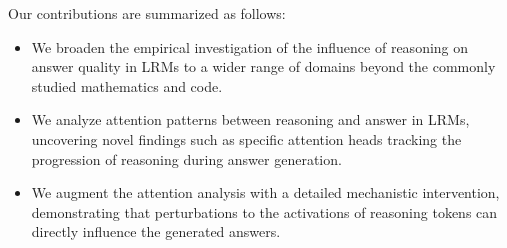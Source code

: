 \documentclass[11pt]{article}
\begin{document}
Our contributions are summarized as follows:
\begin{itemize}[leftmargin=5pt]
\item We broaden the empirical investigation of the influence of reasoning on answer quality in LRMs to a wider range of domains beyond the commonly studied mathematics and code.
\item We analyze attention patterns between reasoning and answer in LRMs, uncovering novel findings such as specific attention heads tracking the progression of reasoning during answer generation.
\item We augment the attention analysis with a detailed mechanistic intervention, demonstrating that perturbations to the activations of reasoning tokens can directly influence the generated answers.
\end{itemize}



\end{document}
